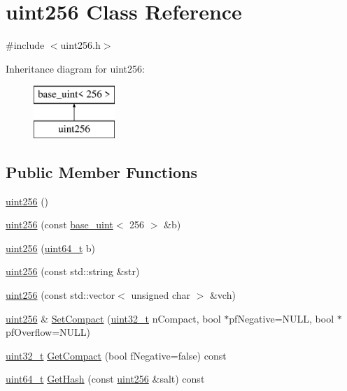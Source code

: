 \hypertarget{classuint256}{}\section{uint256 Class Reference}
\label{classuint256}


{\ttfamily \#include $<$uint256.\+h$>$}

Inheritance diagram for uint256\+:\begin{figure}[H]
\begin{center}
\leavevmode
\includegraphics[height=2.000000cm]{classuint256}
\end{center}
\end{figure}
\subsection*{Public Member Functions}
\begin{DoxyCompactItemize}
\item 
\hyperlink{classuint256_aca0c2c2c61e453717e72a4eaec71168f}{uint256} ()
\item 
\hyperlink{classuint256_af6d285b43ee909dd07448c0dba0c1606}{uint256} (const \hyperlink{classbase__uint}{base\+\_\+uint}$<$ 256 $>$ \&b)
\item 
\hyperlink{classuint256_a1d340146fe2db1dfe45bc6c721e7588b}{uint256} (\hyperlink{stdint_8h_aaa5d1cd013383c889537491c3cfd9aad}{uint64\+\_\+t} b)
\item 
\hyperlink{classuint256_a4078e4911984722778f19581865462b9}{uint256} (const std\+::string \&str)
\item 
\hyperlink{classuint256_a7cad0fc486ebc2ed02462d5a7d4e4f2d}{uint256} (const std\+::vector$<$ unsigned char $>$ \&vch)
\item 
\hyperlink{classuint256}{uint256} \& \hyperlink{classuint256_a54bc91c8535c43f881bba1fdb11ca7fa}{Set\+Compact} (\hyperlink{stdint_8h_a435d1572bf3f880d55459d9805097f62}{uint32\+\_\+t} n\+Compact, bool $\ast$pf\+Negative=N\+U\+L\+L, bool $\ast$pf\+Overflow=N\+U\+L\+L)
\item 
\hyperlink{stdint_8h_a435d1572bf3f880d55459d9805097f62}{uint32\+\_\+t} \hyperlink{classuint256_af30486eee47f077f91ed762d0db6ddca}{Get\+Compact} (bool f\+Negative=false) const 
\item 
\hyperlink{stdint_8h_aaa5d1cd013383c889537491c3cfd9aad}{uint64\+\_\+t} \hyperlink{classuint256_a2ed8bd4e54421a37430768374a7e91b3}{Get\+Hash} (const \hyperlink{classuint256}{uint256} \&salt) const 
\end{DoxyCompactItemize}
